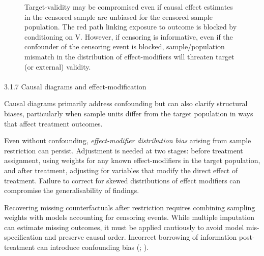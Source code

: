 \documentclass[
  singlecolumn]{article}
\makeatletter
\let\oldparagraph\paragraph
\renewcommand{\paragraph}{
    \@ifstar
      \xxxParagraphStar
      \xxxParagraphNoStar
  }
\newcommand{\xxxParagraphStar}[1]{\oldparagraph*{#1}\mbox{}}
\newcommand{\xxxParagraphNoStar}[1]{\oldparagraph{#1}\mbox{}}
\makeatother
\begin{document}
\begin{figure}


\caption{\label{fig-experiment-selection-collider-adjustment-measured}Target-validity
may be compromised even if causal effect estimates in the censored
sample are unbiased for the censored sample population. The red path
linking exposure to outcome is blocked by conditioning on V. However, if
censoring is informative, even if the confounder of the censoring event
is blocked, sample/population mismatch in the distribution of
effect-modifiers will threaten target (or external) validity.}

\end{figure}%

\paragraph{3.1.7 Causal diagrams and
effect-modification}\label{causal-diagrams-and-effect-modification}

Causal diagrams primarily address confounding but can also clarify
structural biases, particularly when sample units differ from the target
population in ways that affect treatment outcomes.

Even without confounding, \emph{effect-modifier distribution bias}
arising from sample restriction can persist. Adjustment is needed at two
stages: before treatment assignment, using weights for any known
effect-modifiers in the target population, and after treatment,
adjusting for variables that modify the direct effect of treatment.
Failure to correct for skewed distributions of effect modifiers can
compromise the generalisability of findings.

Recovering missing counterfactuals after restriction requires combining
sampling weights with models accounting for censoring events. While
multiple imputation can estimate missing outcomes, it must be applied
cautiously to avoid model mis-specification and preserve causal order.
Incorrect borrowing of information post-treatment can introduce
confounding bias (; ).
\end{document}
